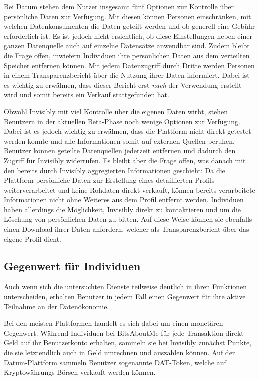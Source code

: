 \noindent Bei Datum stehen dem Nutzer insgesamt fünf Optionen zur Kontrolle über persönliche Daten zur Verfügung. Mit diesen können Personen einschränken, mit welchen Datenkonsumenten die Daten geteilt werden und ob generell eine Gebühr erforderlich ist. Es ist jedoch nicht ersichtlich, ob diese Einstellungen neben einer ganzen Datenquelle auch auf einzelne Datensätze anwendbar sind. Zudem bleibt die Frage offen, inwiefern Individuen ihre persönlichen Daten aus dem verteilten Speicher entfernen können. Mit jedem Datenzugriff durch Dritte werden Personen in einem Transparenzbericht über die Nutzung ihrer Daten informiert. Dabei ist es wichtig zu erwähnen, dass dieser Bericht erst \textit{nach} der Verwendung erstellt wird und somit bereits ein Verkauf stattgefunden hat. \newline

\noindent Obwohl Invisibly mit viel Kontrolle über die eigenen Daten wirbt, stehen Benutzern in der aktuellen Beta-Phase noch wenige Optionen zur Verfügung. Dabei ist es jedoch wichtig zu erwähnen, dass die Plattform nicht direkt getestet werden konnte und alle Informationen somit auf externen Quellen beruhen. Benutzer können geteilte Datenquellen jederzeit entfernen und dadurch den Zugriff für Invisibly widerrufen. Es bleibt aber die Frage offen, was danach mit den bereits durch Invisibly aggregierten Informationen geschieht: Da die Plattform persönliche Daten zur Erstellung eines detaillierten Profils weiterverarbeitet und keine Rohdaten direkt verkauft, können bereits verarbeitete Informationen nicht ohne Weiteres aus dem Profil entfernt werden. Individuen haben allerdings die Möglichkeit, Invisibly direkt zu kontaktieren und um die Löschung von persönlichen Daten zu bitten. Auf diese Weise können sie ebenfalls einen Download ihrer Daten anfordern, welcher als Transparenzbericht über das eigene Profil dient.

\subsection{Gegenwert für Individuen}
Auch wenn sich die untersuchten Dienste teilweise deutlich in ihren Funktionen unterscheiden, erhalten Benutzer in jedem Fall einen Gegenwert für ihre aktive Teilnahme an der Datenökonomie. \newline

\noindent Bei den meisten Plattformen handelt es sich dabei um einen monetären Gegenwert. Während Individuen bei BitsAboutMe für jede Transaktion direkt Geld auf ihr Benutzerkonto erhalten, sammeln sie bei Invisibly zunächst Punkte, die sie letztendlich auch in Geld umrechnen und auszahlen können. Auf der Datum-Plattform sammeln Benutzer sogenannte DAT-Token, welche auf Kryptowährungs-Börsen verkauft werden können. \newline

